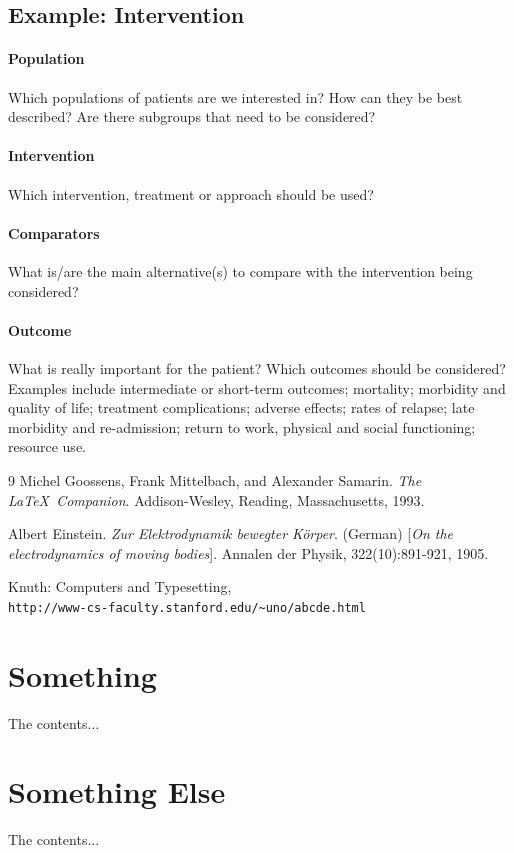 \subsection*{Example: Intervention}

\paragraph{Population} Which populations of patients are we interested in? How can they be best described? Are there subgroups that need to be considered?

\paragraph{Intervention} Which intervention, treatment or approach should be used?

\paragraph{Comparators} What is/are the main alternative(s) to compare with the intervention being considered?

\paragraph{Outcome} What is really important for the patient? Which outcomes should be considered? Examples include intermediate or short-term outcomes; mortality; morbidity and quality of life; treatment complications; adverse effects; rates of relapse; late morbidity and re-admission; return to work, physical and social functioning; resource use.


\newpage
{}
\begin{thebibliography}{9}
Michel Goossens, Frank Mittelbach, and Alexander Samarin. 
\textit{The \LaTeX\ Companion}. 
Addison-Wesley, Reading, Massachusetts, 1993.
 
Albert Einstein. 
\textit{Zur Elektrodynamik bewegter K{\"o}rper}. (German) 
[\textit{On the electrodynamics of moving bodies}]. 
Annalen der Physik, 322(10):891-921, 1905.
 
Knuth: Computers and Typesetting,
\\\texttt{http://www-cs-faculty.stanford.edu/\~{}uno/abcde.html}

\end{thebibliography}
\newpage

\begin{appendices}
\section{Something}
The contents...

\newpage
\section{Something Else}
The contents...
\end{appendices}

